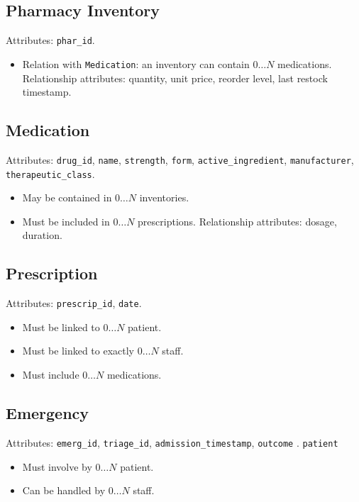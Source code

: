 \documentclass[a4paper,12pt]{article}
\begin{document}
\subsection*{Pharmacy Inventory}
Attributes: \texttt{phar\_id}.  
\begin{itemize}
    \item Relation with \texttt{Medication}: an inventory can contain $0\dots N$ medications.  
    Relationship attributes: quantity, unit price, reorder level, last restock timestamp.
\end{itemize}

\subsection*{Medication}
Attributes: \texttt{drug\_id}, \texttt{name}, \texttt{strength}, \texttt{form}, \texttt{active\_ingredient}, \texttt{manufacturer}, \texttt{therapeutic\_class}.  
\begin{itemize}
    \item May be contained in $0\dots N$ inventories.
    \item Must be included in $0\dots N$ prescriptions.  
    Relationship attributes: dosage, duration.
\end{itemize}

\subsection*{Prescription}
Attributes: \texttt{prescrip\_id}, \texttt{date}.  
\begin{itemize}
    \item Must be linked to $0\dots N$ patient.
    \item Must be linked to exactly $0\dots N$ staff.
    \item Must include $0\dots N$ medications.
\end{itemize}

\subsection*{Emergency}
Attributes: \texttt{emerg\_id}, \texttt{triage\_id}, \texttt{admission\_timestamp}, \texttt{outcome} . \texttt{patient} 
\begin{itemize}
    \item Must involve by $0\dots N$ patient.
    \item Can be handled by $0\dots N$ staff.
\end{itemize}
\end{document}
